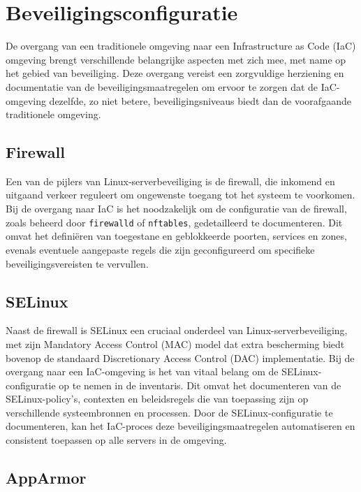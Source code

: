 \section{Beveiligingsconfiguratie}
\label{risico_beveiligingsconfiguratie}

De overgang van een traditionele omgeving naar een Infrastructure as Code (IaC) omgeving brengt verschillende belangrijke aspecten met zich mee, met name op het gebied van beveiliging.
Deze overgang vereist een zorgvuldige herziening en documentatie van de beveiligingsmaatregelen om ervoor te zorgen dat de IaC-omgeving dezelfde, zo niet betere, beveiligingsniveaus biedt dan de voorafgaande traditionele omgeving.

\subsection{Firewall}
\label{risico_firewall}

Een van de pijlers van Linux-serverbeveiliging is de firewall, die inkomend en uitgaand verkeer reguleert om ongewenste toegang tot het systeem te voorkomen.
Bij de overgang naar IaC is het noodzakelijk om de configuratie van de firewall, zoals beheerd door \texttt{firewalld} of \texttt{nftables}, gedetailleerd te documenteren.
Dit omvat het defini\"eren van toegestane en geblokkeerde poorten, services en zones, evenals eventuele aangepaste regels die zijn geconfigureerd om specifieke beveiligingsvereisten te vervullen.

\subsection{SELinux}
\label{risico_selinux}

Naast de firewall is SELinux een cruciaal onderdeel van Linux-serverbeveiliging, met zijn Mandatory Access Control (MAC) model dat extra bescherming biedt bovenop de standaard Discretionary Access Control (DAC) implementatie.
Bij de overgang naar een IaC-omgeving is het van vitaal belang om de SELinux-configuratie op te nemen in de inventaris.
Dit omvat het documenteren van de SELinux-policy's, contexten en beleidsregels die van toepassing zijn op verschillende systeembronnen en processen.
Door de SELinux-configuratie te documenteren, kan het IaC-proces deze beveiligingsmaatregelen automatiseren en consistent toepassen op alle servers in de omgeving.

\subsection{AppArmor}
\label{risico_apparmor}

